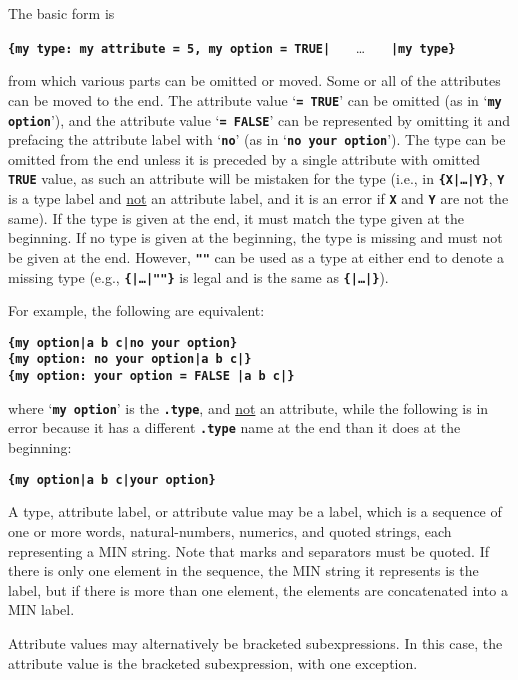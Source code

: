 \documentclass[12pt]{article}
\newcommand{\TT}[1]{{\tt \bfseries #1}}
\begin{document}
The basic form is
\begin{center}
\TT{\{my type: my attribute = 5, my option = TRUE|} ~~~\ldots~~~
    \TT{|my type\}} \\
\end{center}
from which various parts can be omitted or moved.  Some or all of the
attributes can be moved to the end.
The attribute value `\TT{= TRUE}' can be omitted (as in
`\TT{my option}'), and the attribute value `\TT{= FALSE}' can be represented
by omitting it and prefacing the attribute label with `\TT{no}'
(as in `\TT{no your option}').
The type can be omitted from the end unless it is preceded
by a single attribute with omitted \TT{TRUE} value, as such an attribute
will be mistaken for the type
(i.e., in \TT{\{X|\ldots|Y\}}, \TT{Y} is
a type label and \underline{not} an attribute label, and it is an error
if \TT{X} and \TT{Y} are not the same).
If the type is given at the end, it must match the type given at the
beginning.  If no type is given at the beginning, the type is missing
and must not be given at the end.  However, \TT{""} can be used as a type
at either end to denote a missing type (e.g., \TT{\{|\ldots|""\}} is
legal and is the same as \TT{\{|\ldots|\}}).

For example, the following are equivalent:
\begin{center}
\TT{\{my option|a b c|no your option\}} \\
\TT{\{my option:~no your option|a b c|\}} \\
\TT{\{my option:~your option = FALSE |a b c|\}}
\end{center}

where `\TT{my option}' is the \TT{.type}, and \underline{not}
an attribute,
while the following is in error because it has a different \TT{.type} name
at the end than it does at the beginning:
\begin{center}
\TT{\{my option|a b c|your option\}} \\
\end{center}

A type, attribute label, or attribute value may be a label,
which is a sequence
of one or more words, natural-numbers, numerics, and quoted strings, each
representing a MIN string.  Note that marks and separators must be quoted.
If there is only
one element in the sequence, the MIN string it represents is the
label, but if there is more than one element, the elements
are concatenated into a MIN label.

Attribute values may alternatively be bracketed subexpressions.
In this case, the attribute value is the bracketed subexpression,
with one exception.
\end{document}
